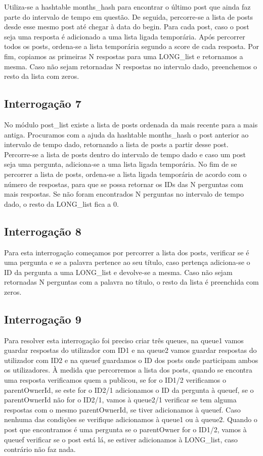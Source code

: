 \documentclass[10pt]{article}
\begin{document}
	Utiliza-se a hashtable months\_hash para encontrar o último post que ainda faz parte do intervalo de tempo em questão. De seguida, percorre-se a lista de posts desde esse mesmo post até chegar à data do begin. Para cada post, caso o post seja uma resposta é adicionado a uma lista ligada temporária. Após percorrer todos os posts, ordena-se a lista temporária segundo a score de cada resposta. Por fim, copiamos as primeiras N respostas para uma LONG\_list e retornamos a mesma. Caso não sejam retornadas N respostas no intervalo dado, preenchemos o resto da lista com zeros.

\subsection{Interrogação 7}

	No módulo post\_list existe a lista de posts ordenada da mais recente para a mais antiga.
	Procuramos com a ajuda da hashtable months\_hash o post anterior ao intervalo de tempo dado, retornando a lista de posts a partir desse post.
	Percorre-se a lista de posts dentro do intervalo de tempo dado e caso um post seja uma pergunta, adiciona-se a uma lista ligada temporária.	
	No fim de se percorrer a lista de posts, ordena-se a lista ligada temporária de acordo com o número de respostas, para que se possa retornar os IDs das N perguntas com mais respostas.
	Se não foram encontrados N perguntas no intervalo de tempo dado, o resto da LONG\_list fica a 0.

\subsection{Interrogação 8}

	Para esta interrogação começamos por percorrer a lista dos posts, verificar se é uma pergunta e se a palavra pertence ao seu título, caso pertença adiciona-se o ID da pergunta a uma LONG\_list e devolve-se a mesma. Caso não sejam retornadas N perguntas com a palavra no título, o resto da lista é preenchida com zeros.

\subsection{Interrogação 9}

	Para resolver esta interrogação foi preciso criar três queues, na queue1 vamos guardar respostas do utilizador com ID1 e na queue2 vamos guardar respostas do utilizador com ID2 e na queuef guardamos o ID dos posts onde participam ambos os utilizadores. À medida que percorremos a lista dos posts, quando se encontra uma resposta verificamos quem a publicou, se for o ID1/2 verificamos o parentOwnerId, se este for o ID2/1 adicionamos o ID da pergunta à queuef, se o parentOwnerId não for o ID2/1, vamos à queue2/1 verificar se tem alguma respostas com o mesmo parentOwnerId, se tiver adicionamos à queuef. Caso nenhuma das condições se verifique adicionamos à queue1 ou à queue2. Quando o post que encontramos é uma pergunta se o parentOwner for o ID1/2, vamos à queuef verificar se o post está lá, se estiver adicionamos à LONG\_list, caso contrário não faz nada.
\end{document}
